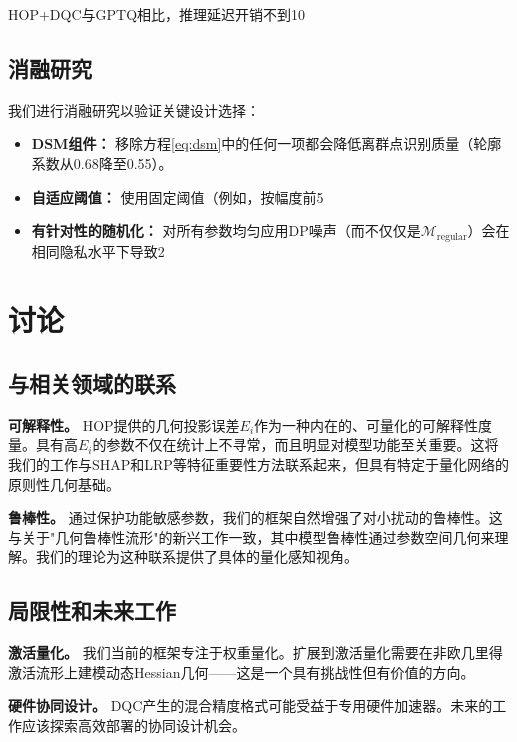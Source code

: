 \documentclass[letterpaper,twocolumn,10pt]{article}
\begin{document}
HOP+DQC与GPTQ相比，推理延迟开销不到10%

\subsection{消融研究}

我们进行消融研究以验证关键设计选择：
\begin{itemize}
\item \textbf{DSM组件：} 移除方程\ref{eq:dsm}中的任何一项都会降低离群点识别质量（轮廓系数从0.68降至0.55）。
\item \textbf{自适应阈值：} 使用固定阈值（例如，按幅度前5%
\item \textbf{有针对性的随机化：} 对所有参数均匀应用DP噪声（而不仅仅是$\mathcal{M}_{\text{regular}}$）会在相同隐私水平下导致2%
\end{itemize}

\section{讨论}
\label{sec:discussion}

\subsection{与相关领域的联系}

\textbf{可解释性。} HOP提供的几何投影误差$E_i$作为一种内在的、可量化的可解释性度量。具有高$E_i$的参数不仅在统计上不寻常，而且明显对模型功能至关重要。这将我们的工作与SHAP和LRP等特征重要性方法联系起来，但具有特定于量化网络的原则性几何基础。

\textbf{鲁棒性。} 通过保护功能敏感参数，我们的框架自然增强了对小扰动的鲁棒性。这与关于"几何鲁棒性流形"的新兴工作一致，其中模型鲁棒性通过参数空间几何来理解。我们的理论为这种联系提供了具体的量化感知视角。

\subsection{局限性和未来工作}

\textbf{激活量化。} 我们当前的框架专注于权重量化。扩展到激活量化需要在非欧几里得激活流形上建模动态Hessian几何——这是一个具有挑战性但有价值的方向。

\textbf{硬件协同设计。} DQC产生的混合精度格式可能受益于专用硬件加速器。未来的工作应该探索高效部署的协同设计机会。
\end{document}
